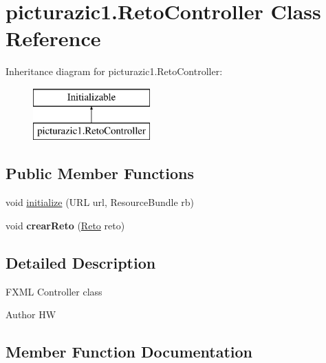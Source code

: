 \hypertarget{classpicturazic1_1_1_reto_controller}{}\section{picturazic1.\+Reto\+Controller Class Reference}
\label{classpicturazic1_1_1_reto_controller}
Inheritance diagram for picturazic1.\+Reto\+Controller\+:\begin{figure}[H]
\begin{center}
\leavevmode
\includegraphics[height=2.000000cm]{classpicturazic1_1_1_reto_controller}
\end{center}
\end{figure}
\subsection*{Public Member Functions}
\begin{DoxyCompactItemize}
\item 
void \mbox{\hyperlink{classpicturazic1_1_1_reto_controller_a48a8cd99d528c1712df7a7c3a8ce20b2}{initialize}} (U\+RL url, Resource\+Bundle rb)
\item 
\mbox{\label{classpicturazic1_1_1_reto_controller_a6b487b3de21e49fde92a8330cb304632}} 
void {\bfseries crear\+Reto} (\mbox{\hyperlink{classmodelo_1_1_reto}{Reto}} reto)
\end{DoxyCompactItemize}


\subsection{Detailed Description}
F\+X\+ML Controller class

\begin{DoxyAuthor}{Author}
HW 
\end{DoxyAuthor}


\subsection{Member Function Documentation}
\mbox{\label{classpicturazic1_1_1_reto_controller_a48a8cd99d528c1712df7a7c3a8ce20b2}} 
